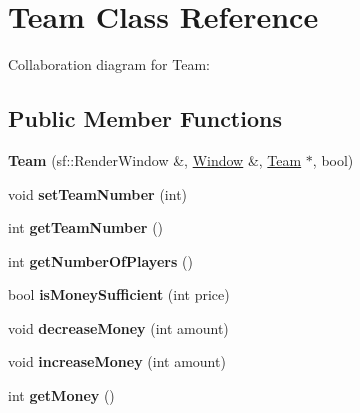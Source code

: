 \hypertarget{class_team}{\section{Team Class Reference}
\label{class_team}
}


Collaboration diagram for Team\+:
\subsection*{Public Member Functions}
\begin{DoxyCompactItemize}
\item 
\hypertarget{class_team_af19196e642e20301c6365a4e0aad0b23}{{\bfseries Team} (sf\+::\+Render\+Window \&, \hyperlink{class_window}{Window} \&, \hyperlink{class_team}{Team} $\ast$, bool)}\label{class_team_af19196e642e20301c6365a4e0aad0b23}

\item 
\hypertarget{class_team_ae0921caad4b3eaef53fa08fc80cc72bb}{void {\bfseries set\+Team\+Number} (int)}\label{class_team_ae0921caad4b3eaef53fa08fc80cc72bb}

\item 
\hypertarget{class_team_af938fc99df2058d9858ca7a67b114b6d}{int {\bfseries get\+Team\+Number} ()}\label{class_team_af938fc99df2058d9858ca7a67b114b6d}

\item 
\hypertarget{class_team_a4a6668b45d1b46016f1a785e6a00d962}{int {\bfseries get\+Number\+Of\+Players} ()}\label{class_team_a4a6668b45d1b46016f1a785e6a00d962}

\item 
\hypertarget{class_team_a777419869d7cbf935819d19809639018}{bool {\bfseries is\+Money\+Sufficient} (int price)}\label{class_team_a777419869d7cbf935819d19809639018}

\item 
\hypertarget{class_team_af0149fd44d2deecacaf1f32ed57ac29e}{void {\bfseries decrease\+Money} (int amount)}\label{class_team_af0149fd44d2deecacaf1f32ed57ac29e}

\item 
\hypertarget{class_team_ab91357abad466cc40fb3dfaa0bed7ba6}{void {\bfseries increase\+Money} (int amount)}\label{class_team_ab91357abad466cc40fb3dfaa0bed7ba6}

\item 
\hypertarget{class_team_a47c8029dbf677471ca93298e7f9a91a9}{int {\bfseries get\+Money} ()}\label{class_team_a47c8029dbf677471ca93298e7f9a91a9}


\end{DoxyCompactItemize}

